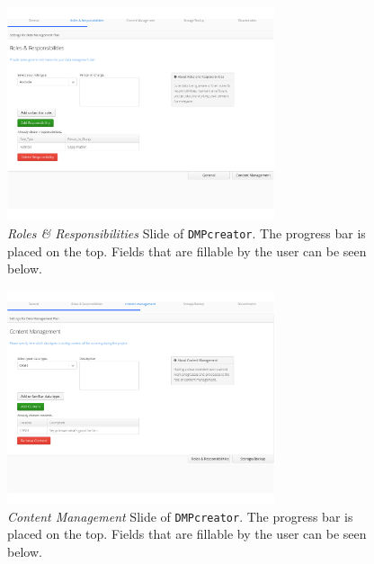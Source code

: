 \begin{figure}[]
	\centering
	\includegraphics[width=0.7\textwidth]{pictures/RolesResponsibilities.png}
	\caption{\textit{Roles \& Responsibilities} Slide of \texttt{DMPcreator}. The progress bar is placed on the top. Fields that are fillable by the user can be seen below.}
	\label{RolesResponsibilitiesSlide}
\end{figure}

\begin{figure}[]
	\centering
	\includegraphics[width=0.7\textwidth]{pictures/ContentManagement.png}
	\caption{\textit{Content Management} Slide of \texttt{DMPcreator}. The progress bar is placed on the top. Fields that are fillable by the user can be seen below.}
	\label{ContentManagementSlide}
\end{figure}

